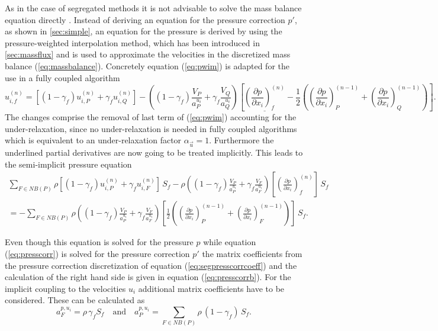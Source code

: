 As in the case of segregated methods it is not advisable to solve the mass balance equation directly \cite{schaefer99}. Instead of deriving an equation for the pressure correction \(p'\), as shown in \ref{sec:simple}, an equation for the pressure is derived by using the pressure-weighted interpolation method, which has been introduced in \ref{sec:massflux} and is used to approximate the velocities in the discretized mass balance (\ref{eq:massbalance}). Concretely equation (\ref{eq:pwim}) is adapted for the use in a fully coupled algorithm
\begin{displaymath}
  u_{i,f}^{(n)} 
  =
  \left[\left(1 - \gamma_f\right) u_{i,P}^{(n)} + \gamma_f u_{i,Q}^{(n)} \right]
  - \left(\left(1 - \gamma_f\right) \frac{V_P}{a_P^{u_i}} + \gamma_f \frac{ V_Q}{a_Q^{u_i}}\right)
  \left[ 
    \underline{ \left(\frac{\partial p}{\partial x_i}\right)_f^{(n)}}
  - \frac{1}{2} 
  \left( 
    \left( \frac{\partial p}{\partial x_i} \right)_P^{(n-1)} 
  + \left(\frac{\partial p}{\partial x_i}\right)_Q^{(n-1)} 
  \right)
  \right].
\end{displaymath}
The changes comprise the removal of last term of (\ref{eq:pwim}) accounting for the under-relaxation, since no under-relaxation is needed in fully coupled algorithms which is equivalent to an under-relaxation factor \(\alpha_\vec{u} = 1\). Furthermore the underlined partial derivatives are now going to be treated implicitly. This leads to the semi-implicit pressure equation
\begin{align}
  \sum_{F \in NB(P)} 
  \rho
  \left[\left(1 - \gamma_f\right) u_{i,P}^{(n)} + \gamma_f u_{i,F}^{(n)} \right]\,  S_f
  - \rho \left(\left(1 - \gamma_f\right) \frac{ V_P}{a_P^{u_i}} + \gamma_f \frac{ V_F}{a_F^{u_i}}\right)
  \left[ 
  \left(\frac{\partial p}{\partial x_i}\right)_f^{(n)}
  \right]\,  S_f \nonumber \\
  =
  - \sum_{F \in NB(P)}
  \rho
  \left(\left(1 - \gamma_f\right) \frac{ V_P}{a_P^{u_i}} + \gamma_f \frac{ V_F}{a_F^{u_i}}\right)
  \left[ 
  \frac{1}{2} 
  \left( 
    \left( \frac{\partial p}{\partial x_i} \right)_P^{(n-1)} 
  + \left(\frac{\partial p}{\partial x_i}\right)_F^{(n-1)} 
  \right)
  \right] \, S_f.
\end{align}

Even though this equation is solved for the pressure \(p\) while equation (\ref{eq:presscorr}) is solved for the pressure correction \(p'\) the matrix coefficients from the pressure correction discretization of equation (\ref{eq:segpresscorrcoeff}) and the calculation of the right hand side is given in equation (\ref{eq:presscorrb}). For the implicit coupling to the velocities \(u_i\) additional matrix coefficients have to be considered. These can be calculated as
\begin{displaymath}
  a_F^{p,u_i} = \rho \, \gamma_f S_f \quad \text{and} \quad a_P^{p,u_i} = \sum_{F \in NB(P)} \rho \, (1-\gamma_f) \, S_f.
\end{displaymath}

